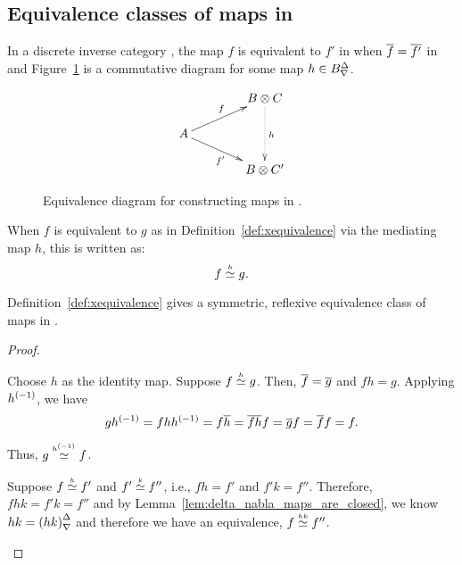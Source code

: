 \subsection{Equivalence classes of maps in \hypX} %
\label{sec:equivalence_classes_of_maps_in_hypx}


\begin{definition}\label{def:xequivalence}
  In a discrete inverse category \X, the map $f$ is equivalent to $f'$ in \X when
  $\overline{f} = \overline{f'}$ in \X and Figure~\ref{fig:xt_map_equivalence_diagram} is a commutative diagram for some
  map $h\in{B}^{\Delta}_{\nabla}$.
\begin{figure}[H]
  \[
    \xymatrix @C=40pt @R=15pt{
      & B \* C  \ar@{.>}[dd]^{h} \\
      A \ar[ur]^f \ar[dr]_{f'}\\
      & B\* C'
    }
  \]
\caption{Equivalence diagram for constructing maps in \Xt.}
\label{fig:xt_map_equivalence_diagram}
\end{figure}
\end{definition}

\begin{notation}\label{notn:xequivalence}
  When $f$ is equivalent to $g$ as in Definition~\ref{def:xequivalence} via the mediating map $h$,
  this is written as:
  \[
    f\overset{\scriptscriptstyle h}{\simeq}g.
  \]
\end{notation}

\begin{lemma}\label{lem:mediating_map_equivalence_is_symmetric_reflexive_and_transitive}
  Definition~\ref{def:xequivalence} gives a symmetric, reflexive equivalence class of maps in \X.
\end{lemma}
\begin{proof}
  \prepprooflist
  \begin{description}
     Choose $h$ as the identity map.
     Suppose $f\overset{\scriptscriptstyle h}{\simeq}g$. Then, $\overline{f} = \overline{g}$ and $f h = g$.
      Applying ${h}^{(-1)}$, we have
      \[
        g {h}^{(-1)} = f h {h}^{(-1)} = f \overline{h} = \overline{f h} f
        = \overline{g} f = \overline{f} f = f.
      \]

      Thus, $g\overset{\scriptscriptstyle {h}^{(-1)}}{\simeq} f$.

     Suppose $f\overset{\scriptscriptstyle h}{\simeq} f'$ and $f' \overset{\scriptscriptstyle k}{\simeq} f''$, i.e., $f h = f'$ and
    $f' k = f''$. Therefore, $f h k = f' k = f''$ and by
    Lemma~\ref{lem:delta_nabla_maps_are_closed}, we know $h k = {(h k)}^{\Delta}_{\nabla}$ and therefore we have
    an equivalence, $f \overset{\scriptscriptstyle h k}{\simeq} f''$.
  \end{description}
\end{proof}

